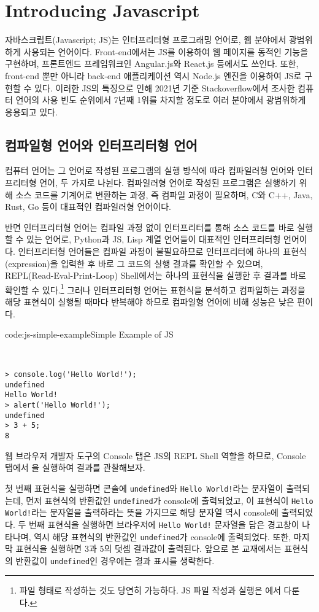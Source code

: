 \section{Introducing Javascript} \label{sect:introducing-javascript}

자바스크립트(Javascript; JS)는 인터프리터형 프로그래밍 언어로, 웹 분야에서 광범위하게 사용되는 언어이다. Front-end에서는 JS를 이용하여 웹 페이지를 동적인 기능을 구현하며, 프론트엔드 프레임워크인 Angular.js와 React.js 등에서도 쓰인다. 또한, front-end 뿐만 아니라 back-end 애플리케이션 역시 Node.js 엔진을 이용하여 JS로 구현할 수 있다. 이러한 JS의 특징으로 인해 2021년 기준 Stackoverflow에서 조사한 컴퓨터 언어의 사용 빈도 순위에서 7년째 1위를 차지할 정도로 여러 분야에서 광범위하게 응용되고 있다.

\subsection*{컴파일형 언어와 인터프리터형 언어}

컴퓨터 언어는 그 언어로 작성된 프로그램의 실행 방식에 따라 컴파일러형 언어와 인터프리터형 언어, 두 가지로 나뉜다. 컴파일러형 언어로 작성된 프로그램은 실행하기 위해 소스 코드를 기계어로 변환하는 과정, 즉 컴파일 과정이 필요하며, C와 C++, Java, Rust, Go 등이 대표적인 컴파일러형 언어이다.

반면 인터프리터형 언어는 컴파일 과정 없이 인터프리터를 통해 소스 코드를 바로 실행할 수 있는 언어로, Python과 JS, Lisp 계열 언어들이 대표적인 인터프리터형 언어이다. 인터프리터형 언어들은 컴파일 과정이 불필요하므로 인터프리터에 하나의 표현식(expression)을 입력한 후 바로 그 코드의 실행 결과를 확인할 수 있으며, REPL(Read-Eval-Print-Loop) Shell에서는 하나의 표현식을 실행한 후 결과를 바로 확인할 수 있다.\footnote{파일 형태로 작성하는 것도 당연히 가능하다. JS 파일 작성과 실행은 에서 다룬다.} 그러나 인터프리터형 언어는 표현식을 분석하고 컴파일하는 과정을 해당 표현식이 실행될 때마다 반복해야 하므로 컴파일형 언어에 비해 성능은 낮은 편이다.

\begin{codeenv}{code:js-simple-example}{Simple Example of JS}\begin{verbatim}


> console.log('Hello World!');
undefined
Hello World!
> alert('Hello World!');
undefined
> 3 + 5;
8
\end{verbatim}
\end{codeenv}

웹 브라우저 개발자 도구의 Console 탭은 JS의 REPL Shell 역할을 하므로, Console 탭에서 을 실행하여 결과를 관찰해보자.

첫 번째 표현식을 실행하면 콘솔에 \texttt{undefined}와 \texttt{Hello World!}라는 문자열이 출력되는데, 먼저 표현식의 반환값인 \texttt{undefined}가 console에 출력되었고, 이 표현식이 \texttt{Hello World!}라는 문자열을 출력하라는 뜻을 가지므로 해당 문자열 역시 console에 출력되었다. 두 번째 표현식을 실행하면 브라우저에 \texttt{Hello World!} 문자열을 담은 경고창이 나타나며, 역시 해당 표현식의 반환값인 \texttt{undefined}가 console에 출력되었다. 또한, 마지막 표현식을 실행하면 3과 5의 덧셈 결과값이 출력된다. 앞으로 본 교재에서는 표현식의 반환값이 \texttt{undefined}인 경우에는 결과 표시를 생략한다.
